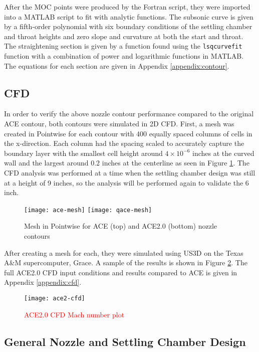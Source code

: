 After the MOC points were produced by the Fortran script, they were imported into a MATLAB script to fit with analytic functions. The subsonic curve is given by a fifth-order polynomial with six boundary conditions of the settling chamber and throat heights and zero slope and curvature at both the start and throat. The straightening section is given by a function found using the \texttt{lsqcurvefit} function with a combination of power and logarithmic functions in MATLAB. The equations for each section are given in Appendix \ref{appendix:contour}.

\subsection{CFD}

In order to verify the above nozzle contour performance compared to the original ACE contour, both contours were simulated in 2D CFD. First, a mesh was created in Pointwise for each contour with 400 equally spaced columns of cells in the x-direction. Each column had the spacing scaled to accurately capture the boundary layer with the smallest cell height around $4 \times 10^{-6}$ inches at the curved wall and the largest around 0.2 inches at the centerline as seen in Figure \ref{fig:mesh}. The CFD analysis was performed at a time when the settling chamber design was still at a height of 9 inches, so the analysis will be performed again to validate the 6 inch.

\begin{figure}[ht!]
    \centering
    \texttt{[image: ace-mesh]}
    \texttt{[image: qace-mesh]}
    \caption{Mesh in Pointwise for ACE (top) and ACE2.0 (bottom) nozzle contours}
    \label{fig:mesh}
\end{figure}

After creating a mesh for each, they were simulated using US3D on the Texas A\&M supercomputer, Grace. A sample of the results is shown in Figure \ref{fig:ace2-cfd}. The full ACE2.0 CFD input conditions and results compared to ACE is given in Appendix \ref{appendix:cfd}.


\begin{figure}[ht!]
    \centering
    \texttt{[image: ace2-cfd]}
    \caption{\textcolor{red}{ACE2.0 CFD Mach number plot}}
    \label{fig:ace2-cfd}
\end{figure}

\subsection{General Nozzle and Settling Chamber Design}

